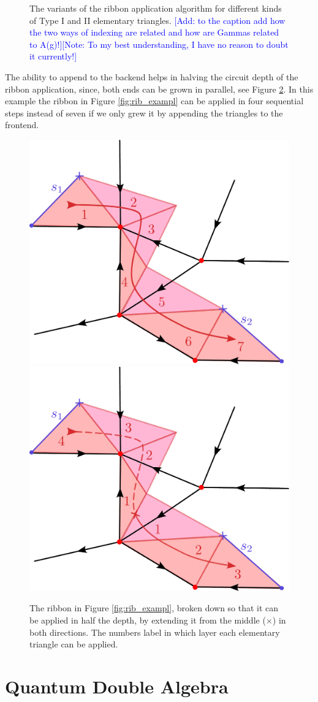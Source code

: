\documentclass[two column]{article}
\newcommand{\jovan}[1]{\textcolor{blue}{[#1]}}
\begin{document}
\begin{figure}
\begin{tabular}{llll}
\end{tabular}\vspace{10pt}
\caption{The variants of the ribbon application algorithm for different kinds of Type I and II elementary triangles. \jovan{Add: to the caption add how the two ways of indexing are related and how are Gammas related to A(g)!}\jovan{Note: To my best understanding, I have no reason to doubt it currently!}}
\label{fig:al_trigs}
\end{figure}
The ability to append to the backend helps in halving the circuit depth of the ribbon application, since, both ends can be grown in parallel, see Figure \ref{fig:both_ends}. In this example the ribbon in Figure \ref{fig:rib_exampl} can be applied in four sequential steps instead of seven if we only grew it by appending the triangles to the frontend.
\begin{figure}
	\centering
	\includegraphics[width=0.45\linewidth]{Figures/front_end.pdf}
	\includegraphics[width=0.45\linewidth]{Figures/both_ends.pdf}
	\caption{The ribbon in Figure \ref{fig:rib_exampl}, broken down so that it can be applied in half the depth, by extending it from the middle ($\times$) in both directions. The numbers label in which layer each elementary triangle can be applied.}
	\label{fig:both_ends}
\end{figure}


\section{Quantum Double Algebra}
\end{document}
